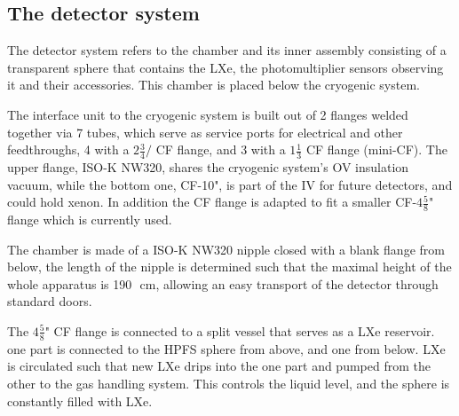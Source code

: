 \subsection{The detector system}
\label{subsec:det}
 
The detector system refers to the chamber and its inner assembly consisting of a transparent sphere that 
contains the LXe, the photomultiplier sensors observing it and their accessories. This chamber is placed below the cryogenic system. 



The interface unit to the cryogenic system is built out of 2 flanges welded together via 7 tubes, which serve as service ports for electrical and other feedthroughs, 4 
with a $2 \frac{3}{4}/$ CF flange, and 3 with a $1\frac{1}{3}$ CF flange (mini-CF). 
The upper flange, ISO-K NW320, shares the cryogenic system's OV insulation vacuum, while the bottom one, CF-10", is part of the IV for future detectors, and could hold xenon. 
In addition the CF flange is adapted to fit a smaller CF-$4\frac{5}{8}$" flange which is currently used.

The chamber is made of a ISO-K NW320 nipple closed with a blank flange from below, 
the length of the nipple is determined such that the maximal height of the whole 
apparatus is 190~\,cm, allowing an easy transport of the detector through standard doors.
 
The $4\frac{5}{8}$" CF flange is connected to a split vessel that serves as a LXe reservoir. one part is connected 
to the HPFS sphere from above, and one from below. LXe is circulated such that new LXe drips into the one part and pumped from the other to the gas handling system. This controls the liquid level, and the sphere is constantly filled with LXe. 


